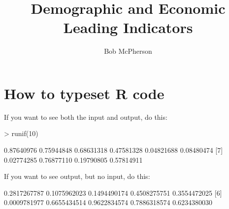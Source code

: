 \documentclass[12pt]{article}         %
\title{Demographic and Economic Leading Indicators}  %
\author{Bob McPherson}          %
\begin{document}




\maketitle              %

\section{How to typeset \textsf{R} code}

If you want to see both the input and output, do this:

\begin{Schunk}
\begin{Sinput}
> runif(10)
\end{Sinput}
\begin{Soutput}
 [1] 0.87640976 0.75944848 0.68631318 0.47581328 0.04821688 0.08480474
 [7] 0.02774285 0.76877110 0.19790805 0.57814911
\end{Soutput}
\end{Schunk}

If you want to see output, but no input, do this:

\begin{Schunk}
\begin{Soutput}
 [1] 0.2817267787 0.1075962023 0.1494490174 0.4508275751 0.3554472025
 [6] 0.0009781977 0.6655434514 0.9622834574 0.7886318574 0.6234380030
\end{Soutput}
\end{Schunk}
\end{document}
